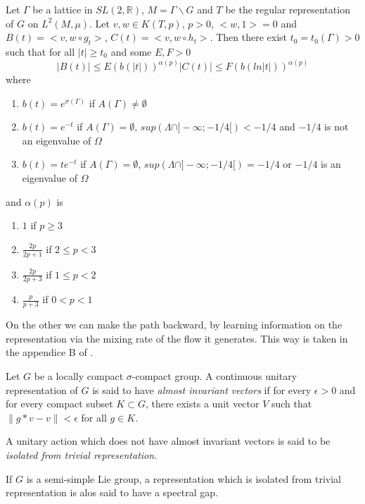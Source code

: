 \begin{thm}
Let $\Gamma$ be a lattice in $SL(2,\mathbb{R})$, $M=\Gamma \backslash G$ and $T$ be the regular representation of $G$ on $L^2 (M, \mu)$. Let $v,w\in K(T,p)$, $p>0$, $<w,1>=0$ and $B(t)=<v,w \circ g_t>$, $C(t)=<v,w \circ h_t>$.
Then there exist $t_0=t_0(\Gamma)>0$ such that for all $|t| \geq t_0$ and some $E,F > 0$\[
|B(t)| \leq E( b(|t|))^{\alpha(p)}
|C(t)| \leq F( b(ln|t|))^{\alpha(p)}
\]
where
\begin{enumerate}
\item $b(t)=e^{\sigma(\Gamma)}$ if $A(\Gamma) \neq \emptyset$
\item $b(t)=e^{-t}$ if $A(\Gamma) = \emptyset$, $sup(\Lambda \cap ]- \infty; -1/4[) < -1/4$ and $-1/4$ is not an eigenvalue of $\Omega$
\item $b(t)=te^{-t}$ if $A(\Gamma) = \emptyset$, $sup(\Lambda \cap ]- \infty; -1/4[)= -1/4$ or $-1/4$ is an eigenvalue of $\Omega$
\end{enumerate}
and $\alpha(p)$ is
\begin{enumerate}
\item $1$ if $p \geq 3$
\item $\frac{2p}{2p+1}$ if $2 \leq p < 3$
\item $\frac{2p}{2p+3}$ if $1 \leq p < 2$
\item $\frac{p}{p+3}$ if $0<p<1$
\end{enumerate}
\end{thm}


On the other we can make the path backward, by learning information on the representation via the mixing rate of the flow it generates. This way is taken in the appendice B of \cite{2005math.....11614A}.

\begin{dfnt}
Let $G$ be a locally compact $\sigma$-compact group. A continuous unitary
 representation of $G$ is said to have \emph{almost invariant vectors}
 if for every $\epsilon > 0$ and for every compact subset $K \subset G$, there exists a unit vector $V$ such that $\|g*v-v\| < \epsilon$ for all $g \in K$.

 A unitary action which does not have almost invariant vectors is said to be \emph{isolated from trivial representation}.

 If $G$ is a semi-simple Lie group, a representation which is isolated from trivial representation is alos said to have a spectral gap.
\end{dfnt}

